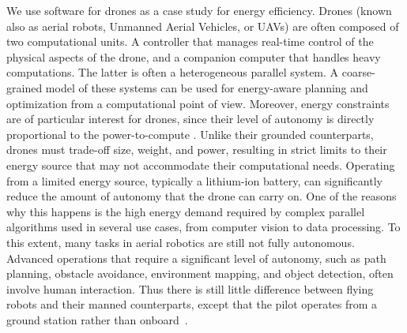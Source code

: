 We use software for drones as a case study for energy efficiency. Drones (known also as aerial robots, Unmanned Aerial Vehicles, or UAVs) are often composed of two computational units. A controller that manages real-time control of the physical aspects of the drone, and a companion computer that handles heavy computations. The latter is often a heterogeneous parallel system. A coarse-grained model of these systems can be used for energy-aware planning and optimization from a computational point of view. Moreover, energy constraints are of particular interest for drones, since their level of autonomy is directly proportional to the power-to-compute \citep{fabiani2007autonomous}. Unlike their grounded counterparts, drones must trade-off size, weight, and power, resulting in strict limits to their energy source that may not accommodate their computational needs. Operating from a limited energy source, typically a lithium-ion battery, can significantly reduce the amount of autonomy that the drone can carry on. One of the reasons why this happens is the high energy demand required by complex parallel algorithms used in several use cases, from computer vision to data processing. To this extent, many tasks in aerial robotics are still not fully autonomous. Advanced operations that require a significant level of autonomy, such as path planning, obstacle avoidance, environment mapping, and object detection, often involve human interaction. Thus there is still little difference between flying robots and their manned counterparts, except that the pilot operates from a ground station rather than onboard~\citep{siciliano2016springer}.

